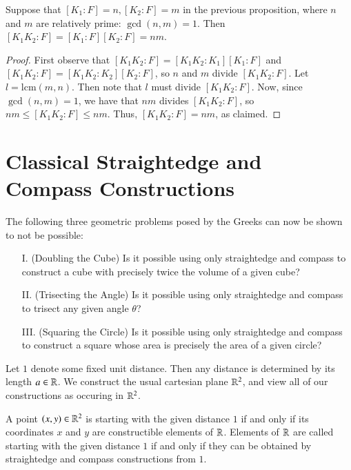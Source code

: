 \documentclass[12pt, a4paper, oneside, openright, titlepage]{book}
\begin{document}
\begin{cor}
    Suppose that $[K_1:F]=n, [K_2:F]=m$ in the previous proposition, where $n$ and $m$ are relatively prime: $\gcd(n,m) = 1$. Then $[K_1K_2:F] = [K_1:F][K_2:F] = nm$.
\end{cor}
\begin{proof}
    First observe that $[K_1K_2:F] = [K_1K_2:K_1][K_1:F]$ and $[K_1K_2:F] = [K_1K_2:K_2][K_2:F]$, so $n$ and $m$ divide $[K_1K_2:F]$. Let $l = \text{lcm}(m,n)$. Then note that $l$ must divide $[K_1K_2:F]$. Now, since $\gcd(n,m) = 1$, we have that $nm$ divides $[K_1K_2:F]$, so $nm \leq [K_1K_2:F] \leq nm$. Thus, $[K_1K_2:F] = nm$, as claimed.
\end{proof}





\section{\textsection Classical Straightedge and Compass Constructions}

The following three geometric problems posed by the Greeks can now be shown to not be possible: 
\begin{enumerate}
    \item[I.] (Doubling the Cube) Is it possible using only straightedge and compass to construct a cube with precisely twice the volume of a given cube?
    \item[II.] (Trisecting the Angle) Is it possible using only straightedge and compass to trisect any given angle $\theta$?
    \item[III.] (Squaring the Circle) Is it possible using only straightedge and compass to construct a square whose area is precisely the area of a given circle?
\end{enumerate}

Let $1$ denote some fixed unit distance. Then any distance is determined by its length $a \in \mathbb R$. We construct the usual cartesian plane $\mathbb R^2$, and view all of our constructions as occuring in $\mathbb R^2$. 

\begin{defn}
    A point $(x,y) \in \mathbb R^2$ is  starting with the given distance $1$ if and only if its coordinates $x$ and $y$ are constructible elements of $\mathbb R$. Elements of $\mathbb R$ are called  starting with the given distance $1$ if and only if they can be obtained by straightedge and compass constructions from $1$.
\end{defn}
\end{document}

